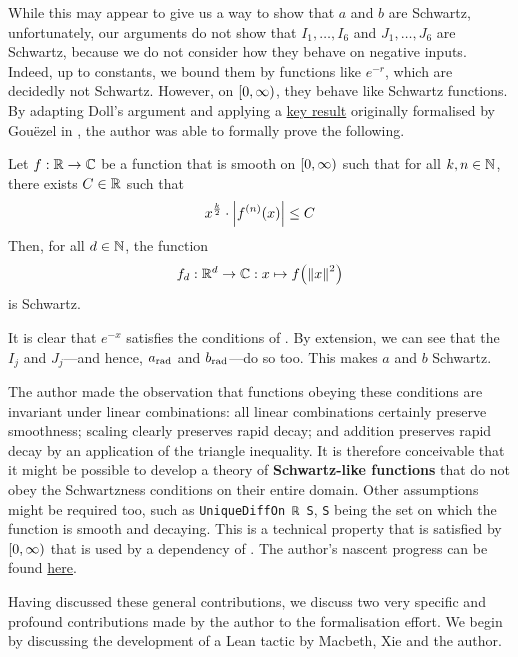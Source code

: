 While this may appear to give us a way to show that $a$ and $b$ are Schwartz, unfortunately, our arguments do not show that $I_1, \ldots, I_6$ and $J_1, \ldots, J_6$ are Schwartz, because we do not consider how they behave on negative inputs. Indeed, up to constants, we bound them by functions like $e^{-r}$, which are decidedly not Schwartz. However, on $\left[0, \infty\right)$, they behave like Schwartz functions. By adapting Doll's argument and applying a \href{https://github.com/leanprover-community/mathlib4/blame/8b8fe2fa631658e55895b284747a997a249d3599/Mathlib/Analysis/Calculus/ContDiff/Bounds.lean#L350}{key result} originally formalised by Gouëzel in , the author was able to formally prove the following.
\begin{boxtheorem}\label{Ch5:Thm:SchwartzLike_to_Schwartz}
    Let $f : \mathbb{R} \to \mathbb{C}$ be a function that is smooth on $\left[0, \infty\right)$ such that for all $k, n \in \mathbb{N}$, there exists $C \in \mathbb{R}$ such that
    \begin{align*}
        x^{\frac{k}{2}} \cdot \left\lvert f^{(n)}\!\left( x \right) \right\rvert \leq C
    \end{align*}
    Then, for all $d \in \mathbb{N}$, the function
    \begin{align*}
        f_d : \mathbb{R}^d \to \mathbb{C} : x \mapsto f\!\left( \left\lVert x \right\rVert^2 \right)
    \end{align*}
    is Schwartz.
\end{boxtheorem}
It is clear that $e^{-x}$ satisfies the conditions of . By extension, we can see that the $I_j$ and $J_j$---and hence, $a_{\operatorname{rad}}$ and $b_{\operatorname{rad}}$---do so too. This makes $a$ and $b$ Schwartz.

The author made the observation that functions obeying these conditions are invariant under linear combinations: all linear combinations certainly preserve smoothness; scaling clearly preserves rapid decay; and addition preserves rapid decay by an application of the triangle inequality. It is therefore conceivable that it might be possible to develop a theory of \textbf{Schwartz-like functions} that do not obey the Schwartzness conditions on their entire domain. Other assumptions might be required too, such as \lstinline|UniqueDiffOn ℝ S|, \lstinline|S| being the set on which the function is smooth and decaying. This is a technical property that is satisfied by $\left[0, \infty\right)$ that is used by a dependency of . The author's nascent progress can be found \href{https://github.com/thefundamentaltheor3m/Sphere-Packing-Lean/blob/b1d9ae9aed06b87cb811fc4b94c2c659519053b0/SpherePacking/ForMathlib/RadialSchwartz/SchwartzLike.lean#L1}{here}.

Having discussed these general contributions, we discuss two very specific and profound contributions made by the author to the formalisation effort. We begin by discussing the development of a Lean tactic by Macbeth, Xie and the author.